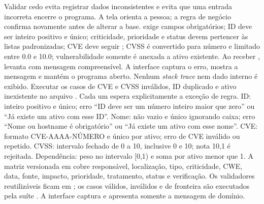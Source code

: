 
 Validar cedo evita registrar dados inconsistentes e evita que uma entrada incorreta encerre o programa. A tela orienta a pessoa; a regra de negócio confirma novamente antes de alterar a base.
  exige campos obrigatórios; ID deve ser inteiro positivo e único; criticidade, prioridade e status devem pertencer às listas padronizadas; CVE deve seguir ; CVSS é convertido para número e limitado entre 0.0 e 10.0; vulnerabilidade somente é anexada a ativo existente.
 Ao receber ,  levanta  com mensagem compreensível. A interface captura o erro, mostra a mensagem e mantém o programa aberto. Nenhum \textit{stack trace} nem dado interno é exibido.
 Executar os casos de CVE e CVSS inválidos, ID duplicado e ativo inexistente no arquivo . Cada um espera explicitamente a exceção de regra.
 ID: inteiro positivo e único; erro ``ID deve ser um número inteiro maior que zero'' ou ``Já existe um ativo com esse ID''. Nome: não vazio e único ignorando caixa; erro ``Nome ou hostname é obrigatório'' ou ``Já existe um ativo com esse nome''. CVE: formato CVE-AAAA-NÚMERO e único por ativo; erro de CVE inválido ou repetido. CVSS: intervalo fechado de 0 a 10, inclusive 0 e 10; nota 10,1 é rejeitada. Dependência: peso no intervalo [0,1) e soma por ativo menor que 1.
 A matriz versionada em  cobre responsável, localização, tipo, criticidade, CWE, data, fonte, impacto, prioridade, tratamento, status e verificação. Os validadores reutilizáveis ficam em ; os casos válidos, inválidos e de fronteira são executados pela suíte . A interface captura  e apresenta somente a mensagem de domínio.

